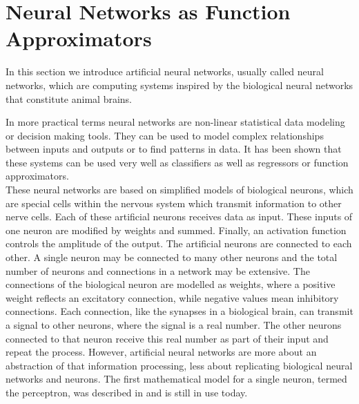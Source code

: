 \section{Neural Networks as Function Approximators}
\label{ch1:sec3}

In this section we introduce artificial neural networks, usually called neural networks, which are computing systems inspired by the biological neural networks that constitute animal brains. 

In more practical terms neural networks are non-linear statistical data modeling or decision making tools. They can be used to model complex relationships between inputs and outputs or to find patterns in data. It has been shown that these systems can be used very well as classifiers as well as regressors or function approximators. \\
These neural networks are based on simplified models of biological neurons, which are special cells within the nervous system which transmit information to other nerve cells. Each of these artificial neurons receives data as input. These inputs of one neuron are modified by weights and summed. Finally, an activation function controls the amplitude of the output. The artificial neurons are connected to each other. A single neuron may be connected to many other neurons and the total number of neurons and connections in a network may be extensive. The connections of the biological neuron are modelled as weights, where a positive weight reflects an excitatory connection, while negative values mean inhibitory connections. Each connection, like the synapses in a biological brain, can transmit a signal to other neurons, where the signal is a real number. The other neurons connected to that neuron receive this real number as part of their input and repeat the process. However, artificial neural networks are more about an abstraction of that information processing, less about replicating biological neural networks and neurons. The first mathematical model for a single neuron, termed the perceptron, was described in \cite{Rosenblatt:1958} and is still in use today. 

